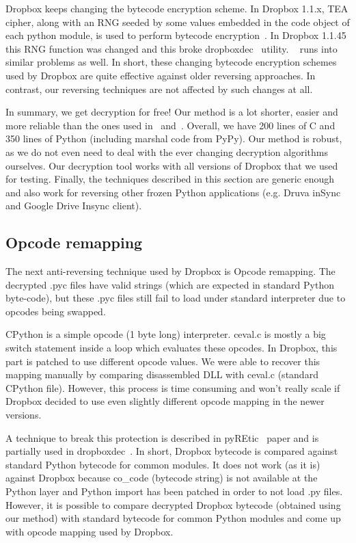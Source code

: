 \documentclass[letterpaper,twocolumn,10pt]{article}
\begin{document}
Dropbox keeps changing the bytecode encryption scheme. In Dropbox 1.1.x, TEA
cipher, along with an RNG seeded by some values embedded in the code object of
each python module, is used to perform bytecode encryption~\cite{dropboxdec}.
In Dropbox 1.1.45 this RNG function was changed and this broke
dropboxdec~\cite{dropboxdec} utility. ~\cite{nicolas2012} runs into similar
problems as well. In short, these changing bytecode encryption schemes used by
Dropbox are quite effective against older reversing approaches. In contrast,
our reversing techniques are not affected by such changes at all.

In summary, we get decryption for free! Our method is a lot shorter, easier and
more reliable than the ones used in~\cite{dropboxdec} and~\cite{nicolas2012}. Overall,
we have 200 lines of C and 350 lines of Python (including marshal code from PyPy).
Our method is robust, as we do not even need to deal with the ever changing
decryption algorithms ourselves. Our decryption tool works with all versions of
Dropbox that we used for testing. Finally, the techniques described in this
section are generic enough and also work for reversing other frozen Python
applications (e.g. Druva inSync and Google Drive Insync client).

\subsection{Opcode remapping}

The next anti-reversing technique used by Dropbox is Opcode remapping. The
decrypted .pyc files have valid strings (which are expected in standard Python
byte-code), but these .pyc files still fail to load under standard interpreter
due to opcodes being swapped.

CPython is a simple opcode (1 byte long) interpreter. ceval.c is mostly a big
switch statement inside a loop which evaluates these opcodes. In Dropbox, this
part is patched to use different opcode values. We were able to recover this
mapping manually by comparing disassembled DLL with ceval.c (standard CPython
file). However, this process is time consuming and won't really scale if
Dropbox decided to use even slightly different opcode mapping in the newer
versions.

A technique to break this protection is described in pyREtic~\cite{smith2010}
paper and is partially used in dropboxdec~\cite{dropboxdec}. In short, Dropbox
bytecode is compared against standard Python bytecode for common modules.
It does not work (as it is) against Dropbox because co\_code (bytecode string)
is not available at the Python layer and Python import has been patched in
order to not load .py files. However, it is possible to compare decrypted
Dropbox bytecode (obtained using our method) with standard bytecode for common
Python modules and come up with opcode mapping used by Dropbox.
\end{document}
